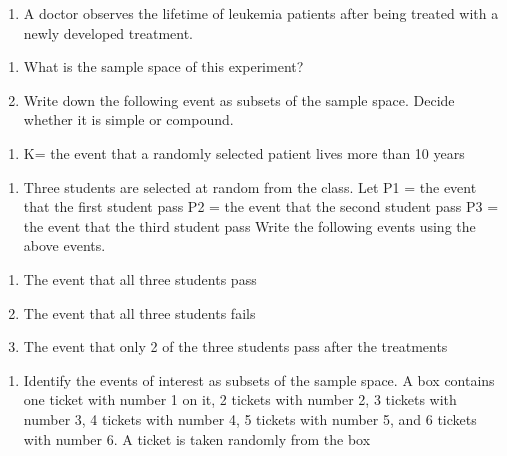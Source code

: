 \documentclass[]{book}
\providecommand{\tightlist}{%
  \setlength{\itemsep}{0pt}\setlength{\parskip}{0pt}}
\begin{document}
\begin{enumerate}
\def\labelenumi{\arabic{enumi}.}
\setcounter{enumi}{7}
\tightlist
\item
  A doctor observes the lifetime of leukemia patients after being treated with a newly developed treatment.
\end{enumerate}

\begin{enumerate}
\def\labelenumi{(\alph{enumi})}
\tightlist
\item
  What is the sample space of this experiment?
\item
  Write down the following event as subsets of the sample space. Decide whether it is
  simple or compound.
\end{enumerate}

\begin{enumerate}
\def\labelenumi{\roman{enumi}.}
\tightlist
\item
  K= the event that a randomly selected patient lives more than 10 years
\end{enumerate}

\begin{enumerate}
\def\labelenumi{\arabic{enumi}.}
\setcounter{enumi}{8}
\tightlist
\item
  Three students are selected at random from the class. Let
  P1 = the event that the first student pass
  P2 = the event that the second student pass
  P3 = the event that the third student pass Write the following events using the above events.
\end{enumerate}

\begin{enumerate}
\def\labelenumi{(\alph{enumi})}
\tightlist
\item
  The event that all three students pass
\item
  The event that all three students fails
\item
  The event that only 2 of the three students pass after the treatments
\end{enumerate}

\begin{enumerate}
\def\labelenumi{\arabic{enumi}.}
\setcounter{enumi}{9}
\tightlist
\item
  Identify the events of interest as subsets of the sample space. A box contains one ticket with number 1 on it, 2 tickets with number 2, 3 tickets with number 3, 4 tickets with number 4, 5 tickets with number 5, and 6 tickets with number 6. A ticket is taken randomly from the box
\end{enumerate}
\end{document}

